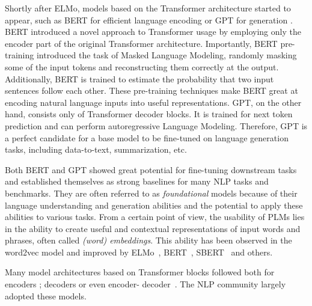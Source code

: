 Shortly after ELMo, models based on the Transformer architecture started to appear, such as BERT for efficient language encoding \cite{devlin2019} or GPT for generation \cite{radford2018improving}.
BERT introduced a novel approach to Transformer usage by employing only the encoder part of the original Transformer architecture.
Importantly, BERT pre-training introduced the task of Masked Language Modeling, randomly masking some of the input tokens and reconstructing them correctly at the output.
Additionally, BERT is trained to estimate the probability that two input sentences follow each other.
These pre-training techniques make BERT great at encoding natural language inputs into useful representations.
GPT, on the other hand, consists only of Transformer decoder blocks.
It is trained for next token prediction and can perform autoregressive Language Modeling.
Therefore, GPT is a perfect candidate for a base model to be fine-tuned on language generation tasks, including data-to-text, summarization, etc.


Both BERT and GPT showed great potential for fine-tuning downstream tasks and established themselves as strong baselines for many NLP tasks and benchmarks.
They are often referred to as \emph{foundational} models because of their language understanding and generation abilities and the potential to apply these abilities to various tasks.
From a certain point of view, the usability of PLMs lies in the ability to create useful and contextual representations of input words and phrases, often called \emph{(word) embeddings}.
This ability has been observed in the word2vec model \cite{mikolov2013distributed} and improved by ELMo~\cite{peters-etal-2018-deep}, BERT~\cite{devlin2019}, SBERT~\cite{reimers2019sentence} and others.

Many model architectures based on Transformer blocks followed both for encoders \cite{liu2019roberta,reimers2019sentence}; decoders \cite{radford2019language,brown2020language} or even encoder- decoder~\cite{raffel2020exploring,lewis-etal-2020-bart}.
The NLP community largely adopted these models.


